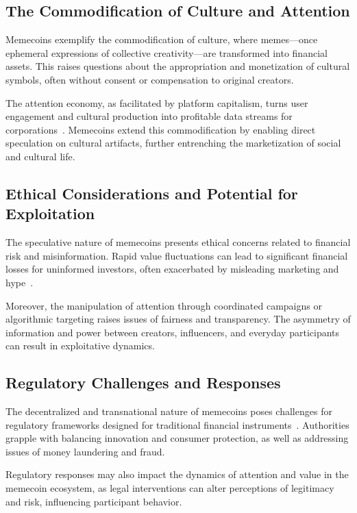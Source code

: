 \documentclass[a4paper,12pt]{article}
\begin{document}
\subsection{The Commodification of Culture and Attention}

Memecoins exemplify the commodification of culture, where memes—once ephemeral expressions of collective creativity—are transformed into financial assets. This raises questions about the appropriation and monetization of cultural symbols, often without consent or compensation to original creators.

The attention economy, as facilitated by platform capitalism, turns user engagement and cultural production into profitable data streams for corporations~\cite{srnicek2017platform}. Memecoins extend this commodification by enabling direct speculation on cultural artifacts, further entrenching the marketization of social and cultural life.

\subsection{Ethical Considerations and Potential for Exploitation}

The speculative nature of memecoins presents ethical concerns related to financial risk and misinformation. Rapid value fluctuations can lead to significant financial losses for uninformed investors, often exacerbated by misleading marketing and hype~\cite{gudgeon2020defi}.

Moreover, the manipulation of attention through coordinated campaigns or algorithmic targeting raises issues of fairness and transparency. The asymmetry of information and power between creators, influencers, and everyday participants can result in exploitative dynamics.

\subsection{Regulatory Challenges and Responses}

The decentralized and transnational nature of memecoins poses challenges for regulatory frameworks designed for traditional financial instruments~\cite{fenwick2018regulating}. Authorities grapple with balancing innovation and consumer protection, as well as addressing issues of money laundering and fraud.

Regulatory responses may also impact the dynamics of attention and value in the memecoin ecosystem, as legal interventions can alter perceptions of legitimacy and risk, influencing participant behavior.
\end{document}
